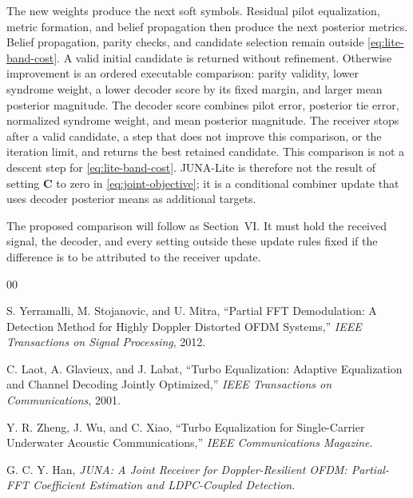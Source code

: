 \documentclass[conference]{IEEEtran}
\begin{document}
The new weights produce the next soft symbols.  Residual pilot equalization,
metric formation, and belief propagation then produce the next posterior
metrics.  Belief propagation, parity checks, and candidate selection remain
outside \eqref{eq:lite-band-cost}.  A valid initial candidate is returned
without refinement.  Otherwise improvement is an ordered executable
comparison: parity validity, lower syndrome weight, a lower decoder score by
its fixed margin, and larger mean posterior magnitude.  The decoder score
combines pilot error, posterior tie error, normalized syndrome weight, and
mean posterior magnitude.  The receiver stops after a valid candidate, a step
that does not improve this comparison, or the iteration limit, and returns the
best retained candidate.  This comparison is not a descent step for
\eqref{eq:lite-band-cost}.  JUNA-Lite is therefore not the result of setting
\(\mathbf C\) to zero in \eqref{eq:joint-objective}; it is a conditional
combiner update that uses decoder posterior means as additional targets.

The proposed comparison will follow as Section~VI.  It must hold the
received signal, the decoder, and every setting outside these update rules
fixed if the difference is to be attributed to the receiver update.

\begin{thebibliography}{00}

S. Yerramalli, M. Stojanovic, and U. Mitra,
``Partial FFT Demodulation: A Detection Method for Highly Doppler Distorted
OFDM Systems,''
\emph{IEEE Transactions on Signal Processing}, 2012.

C. Laot, A. Glavieux, and J. Labat,
``Turbo Equalization: Adaptive Equalization and Channel Decoding Jointly
Optimized,''
\emph{IEEE Transactions on Communications}, 2001.

Y. R. Zheng, J. Wu, and C. Xiao,
``Turbo Equalization for Single-Carrier Underwater Acoustic Communications,''
\emph{IEEE Communications Magazine}.

G. C. Y. Han,
\emph{JUNA: A Joint Receiver for Doppler-Resilient OFDM: Partial-FFT
Coefficient Estimation and LDPC-Coupled Detection}.

\end{thebibliography}
\end{document}
